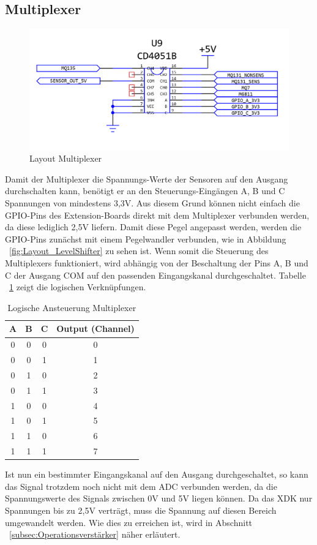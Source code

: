 \subsection{Multiplexer}\label{subsec:Multiplexer}
\begin{figure}[H]
	\includegraphics[width=\textwidth]{images/Layout_Multiplexer.png}	
	\caption{Layout Multiplexer}
	\label{fig:Layout_Multiplexer}
\end{figure}
Damit der Multiplexer die Spannungs-Werte der Sensoren auf den Ausgang durchschalten kann, benötigt er an den Steuerungs-Eingängen A, B und C Spannungen von mindestens 3,3V. Aus diesem Grund können nicht einfach die \acs{GPIO}-Pins des Extension-Boards direkt mit dem Multiplexer verbunden werden, da diese lediglich 2,5V liefern. Damit diese Pegel angepasst werden, werden die \acs{GPIO}-Pins zunächst mit einem Pegelwandler verbunden, wie in Abbildung ~\ref{fig:Layout_LevelShifter} zu sehen ist.
\newline
Wenn somit die Steuerung des Multiplexers funktioniert, wird abhängig von der Beschaltung der Pins A, B und C der Ausgang COM auf den passenden Eingangskanal durchgeschaltet. Tabelle ~\ref{tab:MultiplexerLogic} zeigt die logischen Verknüpfungen.
\begin{table}[H]
	\begin{center}
			\begin{tabular}{|c|c|c|c|}
				\hline
				A & B & C & Output (Channel)  \\ \hline \hline
				
				0 & 0 & 0 & 0 \\ \hline 
				0 & 0 & 1 & 1 \\ \hline 
				0 & 1 & 0 & 2 \\ \hline 
				0 & 1 & 1 & 3 \\ \hline 
				1 & 0 & 0 & 4 \\ \hline 
				1 & 0 & 1 & 5 \\ \hline 
				1 & 1 & 0 & 6 \\ \hline 
				1 & 1 & 1 & 7 \\ \hline 							
			\end{tabular}
	\end{center}
	\caption{Logische Ansteuerung Multiplexer}
	\label{tab:MultiplexerLogic}
\end{table}
Ist nun ein bestimmter Eingangskanal auf den Ausgang durchgeschaltet, so kann das Signal trotzdem noch nicht mit dem \acs{ADC} verbunden werden, da die Spannungswerte des Signals zwischen 0V und 5V liegen können. Da das XDK nur Spannungen bis zu 2,5V verträgt, muss die Spannung auf diesen Bereich umgewandelt werden. Wie dies zu erreichen ist, wird in Abschnitt ~\ref{subsec:Operationsverstärker} näher erläutert.
